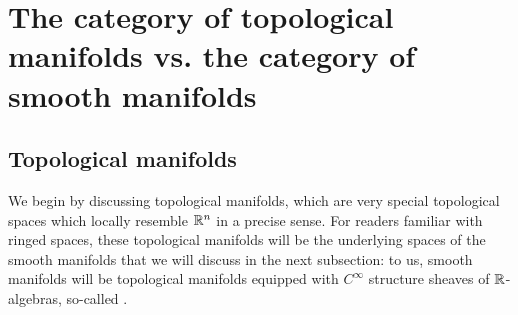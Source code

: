 \section{The category of topological manifolds vs. the category of smooth manifolds}
    \subsection{Topological manifolds}
        We begin by discussing topological manifolds, which are very special topological spaces which locally resemble $\mathbb{R}^n$ in a precise sense. For readers familiar with ringed spaces, these topological manifolds will be the underlying spaces of the smooth manifolds that we will discuss in the next subsection: to us, smooth manifolds will be topological manifolds equipped with $C^{\infty}$ structure sheaves of $\mathbb{R}$-algebras, so-called .
    
